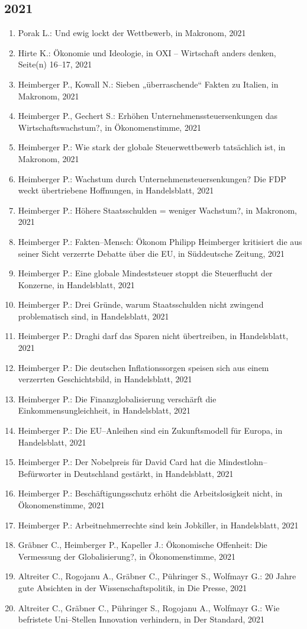 \subsection*{2021}
\begin{enumerate}
    	 \item Porak L.: Und ewig lockt der Wettbewerb, in Makronom, 2021
	 \item Hirte K.: Ökonomie und Ideologie, in OXI -- Wirtschaft anders denken, Seite(n) 16--17, 2021
	 \item Heimberger P., Kowall N.: Sieben „überraschende“ Fakten zu Italien, in Makronom, 2021
	 \item Heimberger P., Gechert S.: Erhöhen Unternehmenssteuersenkungen das Wirtschaftswachstum?, in Ökonomenstimme, 2021
	 \item Heimberger P.: Wie stark der globale Steuerwettbewerb tatsächlich ist, in Makronom, 2021
	 \item Heimberger P.: Wachstum durch Unternehmensteuersenkungen? Die FDP weckt übertriebene Hoffnungen, in Handelsblatt, 2021
	 \item Heimberger P.: Höhere Staatsschulden = weniger Wachstum?, in Makronom, 2021
	 \item Heimberger P.: Fakten--Mensch: Ökonom Philipp Heimberger kritisiert die aus seiner Sicht verzerrte Debatte über die EU, in Süddeutsche Zeitung, 2021
	 \item Heimberger P.: Eine globale Mindeststeuer stoppt die Steuerflucht der Konzerne, in Handelsblatt, 2021
	 \item Heimberger P.: Drei Gründe, warum Staatsschulden nicht zwingend problematisch sind, in Handelsblatt, 2021
	 \item Heimberger P.: Draghi darf das Sparen nicht übertreiben, in Handelsblatt, 2021
	 \item Heimberger P.: Die deutschen Inflationssorgen speisen sich aus einem verzerrten Geschichtsbild, in Handelsblatt, 2021
	 \item Heimberger P.: Die Finanzglobalisierung verschärft die Einkommensungleichheit, in Handelsblatt, 2021
	 \item Heimberger P.: Die EU--Anleihen sind ein Zukunftsmodell für Europa, in Handelsblatt, 2021
	 \item Heimberger P.: Der Nobelpreis für David Card hat die Mindestlohn--Befürworter in Deutschland gestärkt, in Handelsblatt, 2021
	 \item Heimberger P.: Beschäftigungsschutz erhöht die Arbeitslosigkeit nicht, in Ökonomenstimme, 2021
	 \item Heimberger P.: Arbeitnehmerrechte sind kein Jobkiller, in Handelsblatt, 2021
	 \item Gräbner C., Heimberger P., Kapeller J.: Ökonomische Offenheit: Die Vermessung der Globalisierung?, in Ökonomenstimme, 2021
	 \item Altreiter C., Rogojanu A., Gräbner C., Pühringer S., Wolfmayr G.: 20 Jahre gute Absichten in der Wissenschaftspolitik, in Die Presse, 2021
	 \item Altreiter C., Gräbner C., Pühringer S., Rogojanu A., Wolfmayr G.: Wie befristete Uni--Stellen Innovation verhindern, in Der Standard, 2021
\end{enumerate}
